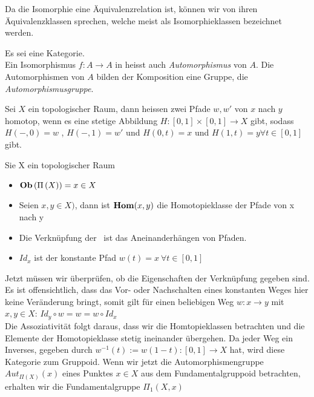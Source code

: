 \documentclass{article}
\renewcommand{\id}{\ensuremath{Id}}
\begin{document}
		\begin{defi}[Isomorphieklassen]
			\cite[Definition 2.3.10]{Bra}
		 Da die Isomorphie eine \"Aquivalenzrelation ist, k\"onnen wir von ihren \"Aquivalenzklassen sprechen, welche meist als Isomorphieklassen bezeichnet werden.
		\end{defi}
		 
		 
		\begin{defi}[Automorphismengruppen]
		\cite[Definition 2.3.13]{Bra}
		 Es sei \CatC eine Kategorie.  \\
		 Ein Isomorphismus \( f:A \to A \) in \CatC heisst auch \emph{Automorphismus} von $A$. 
		 Die Automorphismen von $A$ bilden \bzgl der Komposition eine Gruppe, die \emph{Automorphismusgruppe}.
		\end{defi}
		
		\begin{defi}[Homotopieklasse]
			\cite[Aufgabe 2.24]{Bra}
		 	Sei \( X \) ein topologischer Raum, dann heissen zwei Pfade \( w,w'  \) von \(x \) nach \( y \) homotop, 
			wenn es eine stetige Abbildung \( H : [0,1] \times [0,1 ] \to X \) gibt, 
			sodass \( H(-,0) = w \) , \( H( -,1) =w' \) und \( H(0,t) =x \) und \(H(1,t) = y \forall t \in [0,1] \) gibt.
		\end{defi}
		 
		\begin{bsp}[Fundamentalgruppoid]
		 	\cite[Aufgabe 2.24 ]{Bra}
		 	Sie X ein topologischer Raum
		\begin{itemize}
			\item \( \mathbf{Ob}  \left( \Pi \left( X \right) \right) = x \in X \)
			\item Seien \( x ,y \in X ) \), dann ist \(  \mathbf{Hom } (x,y) \) die Homotopieklasse der Pfade von x nach y
			\item Die Verkn\"upfung der \Hom \ ist das Aneinanderh\"angen von Pfaden.
			\item \(  \id_x \) ist der konstante Pfad \( w(t)=x \ \forall t \in [0,1] \)
		\end{itemize}
		Jetzt m\"ussen wir \"uberpr\"ufen, ob die Eigenschaften der Verkn\"upfung gegeben sind.
		Es ist offensichtlich, dass das Vor- oder Nachschalten eines konstanten Weges hier keine Ver\"anderung bringt, somit gilt f\"ur einen beliebigen Weg 
		\(w:x \to y \) mit \( x,y \in X\):
		\( \id_y \circ w = w = w \circ \id_x \) \\
		Die Assoziativit\"at folgt daraus, dass wir die Homtopieklassen betrachten und die Elemente der Homotopieklasse stetig ineinander \"ubergehen.
		Da jeder Weg ein Inverses, gegeben durch \( w^{-1}(t):=w(1-t): [0,1] \to X \) hat, wird diese Kategorie zum Gruppoid.
		Wenn wir jetzt die Automorphismengruppe \( Aut_{\Pi(X)}(x) \) eines Punktes \(x \in X \) aus dem Fundamentalgruppoid betrachten, erhalten wir die Fundamentalgruppe \( \Pi_1(X,x) \) \cite[Beispiel 2.3.14-(8)]{Bra}
		\end{bsp}
	
\end{document}
